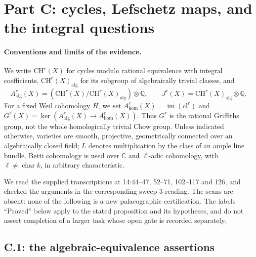 \section{Part C: cycles, Lefschetz maps, and the integral questions}
\label{sec:cycles-audit}

\paragraph{Conventions and limits of the evidence.}
We write $\mathrm{CH}^r(X)$ for cycles modulo rational equivalence with
integral coefficients, $\mathrm{CH}^r(X)_{\mathrm{alg}}$ for its subgroup of
algebraically trivial classes, and
\[
 A^r_{\mathrm{alg}}(X)=
 (\mathrm{CH}^r(X)/\mathrm{CH}^r(X)_{\mathrm{alg}})\otimes\mathbb Q,
 \qquad
 J^r(X)=\mathrm{CH}^r(X)_{\mathrm{alg}}\otimes\mathbb Q.
\]
For a fixed Weil cohomology $H$, we set
$A^r_{\mathrm{hom}}(X)=\operatorname{im}(\mathrm{cl}^r)$ and
$G^r(X)=\ker(A^r_{\mathrm{alg}}(X)\longrightarrow A^r_{\mathrm{hom}}(X))$.
Thus $G^r$ is the rational Griffiths group, not the whole homologically
trivial Chow group. Unless indicated otherwise, varieties are smooth,
projective, geometrically connected over an algebraically closed field;
$L$ denotes multiplication by the class of an ample line bundle. Betti
cohomology is used over $\mathbb C$ and $\ell$-adic cohomology, with
$\ell\ne\operatorname{char}k$, in arbitrary characteristic.

We read the supplied transcriptions at 14:44--47, 52--71, 102--117 and 126,
and checked the arguments in the corresponding sweep-3 reading. The scans
are absent: none of the following is a new palaeographic certification.
The labels ``Proved'' below apply to the stated proposition and its
hypotheses, and do not assert completion of a larger task whose open gate
is recorded separately.

\subsection{C.1: the algebraic-equivalence assertions}

